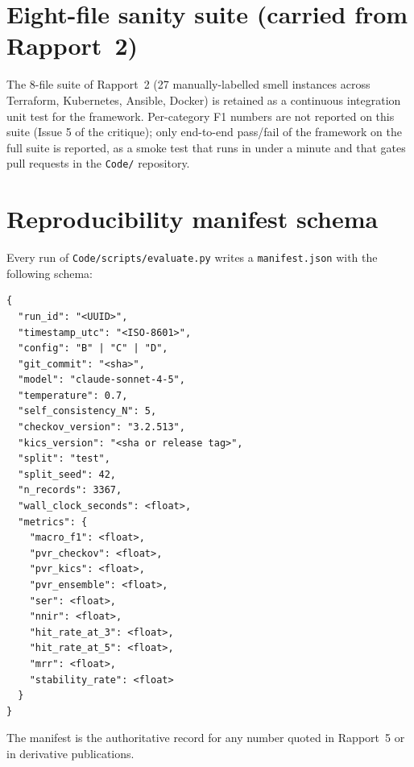 \documentclass[12pt, a4paper]{report}
\begin{document}
\appendix

\chapter{Eight-file sanity suite (carried from Rapport~2)}
\label{app:8file}

The 8-file suite of Rapport~2 (27 manually-labelled smell instances across
Terraform, Kubernetes, Ansible, Docker) is retained as a continuous
integration unit test for the framework. Per-category F1 numbers are not
reported on this suite (Issue 5 of the critique); only end-to-end
pass/fail of the framework on the full suite is reported, as a smoke test
that runs in under a minute and that gates pull requests in the
\texttt{Code/} repository.

\chapter{Reproducibility manifest schema}
\label{app:manifest}

Every run of \texttt{Code/scripts/evaluate.py} writes a
\texttt{manifest.json} with the following schema:

\begin{lstlisting}
{
  "run_id": "<UUID>",
  "timestamp_utc": "<ISO-8601>",
  "config": "B" | "C" | "D",
  "git_commit": "<sha>",
  "model": "claude-sonnet-4-5",
  "temperature": 0.7,
  "self_consistency_N": 5,
  "checkov_version": "3.2.513",
  "kics_version": "<sha or release tag>",
  "split": "test",
  "split_seed": 42,
  "n_records": 3367,
  "wall_clock_seconds": <float>,
  "metrics": {
    "macro_f1": <float>,
    "pvr_checkov": <float>,
    "pvr_kics": <float>,
    "pvr_ensemble": <float>,
    "ser": <float>,
    "nnir": <float>,
    "hit_rate_at_3": <float>,
    "hit_rate_at_5": <float>,
    "mrr": <float>,
    "stability_rate": <float>
  }
}
\end{lstlisting}

The manifest is the authoritative record for any number quoted in
Rapport~5 or in derivative publications.
\end{document}
